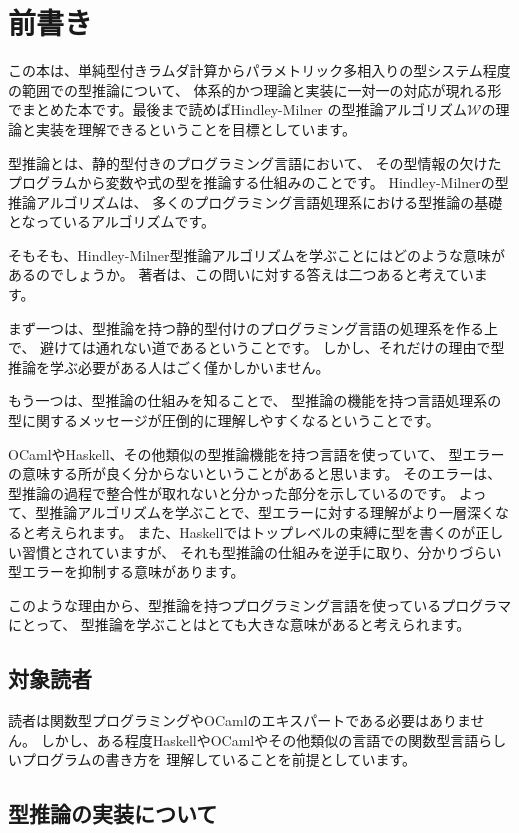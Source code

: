 
\chapter{前書き}

この本は、単純型付きラムダ計算からパラメトリック多相入りの型システム程度の範囲での型推論について、
体系的かつ理論と実装に一対一の対応が現れる形でまとめた本です。最後まで読めばHindley-Milner
の型推論アルゴリズム$\mathcal W$の理論と実装を理解できるということを目標としています。

型推論とは、静的型付きのプログラミング言語において、
その型情報の欠けたプログラムから変数や式の型を推論する仕組みのことです。
Hindley-Milnerの型推論アルゴリズムは、
多くのプログラミング言語処理系における型推論の基礎となっているアルゴリズムです。

そもそも、Hindley-Milner型推論アルゴリズムを学ぶことにはどのような意味があるのでしょうか。
著者は、この問いに対する答えは二つあると考えています。

まず一つは、型推論を持つ静的型付けのプログラミング言語の処理系を作る上で、
避けては通れない道であるということです。
しかし、それだけの理由で型推論を学ぶ必要がある人はごく僅かしかいません。

もう一つは、型推論の仕組みを知ることで、
型推論の機能を持つ言語処理系の型に関するメッセージが圧倒的に理解しやすくなるということです。

OCamlやHaskell、その他類似の型推論機能を持つ言語を使っていて、
型エラーの意味する所が良く分からないということがあると思います。
そのエラーは、型推論の過程で整合性が取れないと分かった部分を示しているのです。
よって、型推論アルゴリズムを学ぶことで、型エラーに対する理解がより一層深くなると考えられます。
また、Haskellではトップレベルの束縛に型を書くのが正しい習慣とされていますが、
それも型推論の仕組みを逆手に取り、分かりづらい型エラーを抑制する意味があります。

このような理由から、型推論を持つプログラミング言語を使っているプログラマにとって、
型推論を学ぶことはとても大きな意味があると考えられます。

\section*{対象読者}

読者は関数型プログラミングやOCamlのエキスパートである必要はありません。
しかし、ある程度HaskellやOCamlやその他類似の言語での関数型言語らしいプログラムの書き方を
理解していることを前提としています。

\section*{型推論の実装について}

